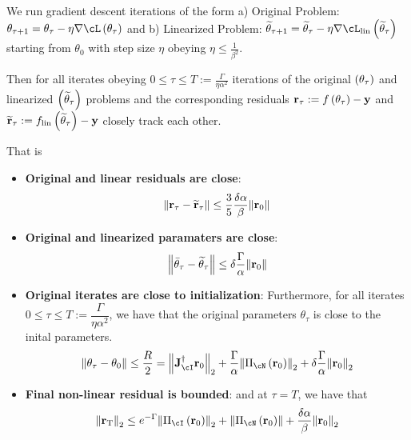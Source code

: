 \documentclass[a4paper]{article}
\begin{document}
\begin{thm}
  
  We run gradient descent iterations of the form a) Original Problem: $\theta_{\tau + 1} =
  \theta_\tau - \eta\nabla\cL\br{\theta_\tau}$ and
  b) Linearized Problem: $\widetilde{\theta}_{\tau+1} = \widetilde{\theta}_\tau -
  \eta\nabla\cL_{\mathrm{lin}}\br{\widetilde{\theta}_\tau}$ starting from $\theta_0$ with step
  size $\eta$ obeying $\eta\le \frac{1}{\beta^2}$. 

Then for all iterates obeying $0\le \tau\le T:= \frac{\Gamma}{\eta\alpha^2}$
  iterations of the original $\left({\theta_\tau}\right)$ and linearized
  $\left({\widetilde{\theta}_\tau}\right)$ problems and the corresponding
  residuals ${\mathbf{r}}_\tau:=f\left({\theta_\tau}\right) - {\mathbf{y}}$ and
  $\widetilde{{\mathbf{r}}}_\tau:=f_{\mathrm{lin}}\left({\widetilde{\theta}_\tau}\right)
  - {\mathbf{y}}$ closely track each other.

  That is
  \begin{itemize}
  \item \textbf{Original and linear residuals are close}: \begin{equation}
    \label{eq:residual_close}
    \mathrm{\left\lVert{\mathbf{r}}_\tau - \widetilde{{\mathbf{r}}}_\tau\right\rVert}\le \dfrac{3}{5}\dfrac{\delta\alpha}{\beta}\mathrm{\left\lVert{\mathbf{r}}_0\right\rVert}
  \end{equation}
\item \textbf{Original and linearized paramaters are close}:
  \begin{equation}
    \label{eq:param_close}
   \mathrm{\left\lVert\bar{\theta}_\tau - \widetilde{\theta}_\tau\right\rVert}\le \delta\dfrac{\Gamma}{\alpha}\mathrm{\left\lVert{\mathbf{r}}_0\right\rVert}
  \end{equation}
\item \textbf{Original iterates are close to initialization}: Furthermore, for all iterates $0\le \tau\le
T:=\dfrac{\Gamma}{\eta\alpha^2}$, we have that the original parameters
$\theta_\tau$ is close to the inital parameters.
\begin{equation}
  \label{eq:final_param_close}
  \norm{\theta_\tau - \theta_0}\le \dfrac{R}{2} =
  \norm{\vec{J}_{\cI}^\dagger\vec{r}_0}_2 +
  \dfrac{\Gamma}{\alpha}\norm{\Pi_\cN\br{\vec{r}_0}}_2 + \delta\dfrac{\Gamma}{\alpha}\norm{\vec{r}_0}_2
\end{equation}
\item \textbf{Final non-linear residual is bounded}: and at $\tau=T$, we have that
\begin{equation}
  \label{eq:final_residual}
  \norm{\vec{r}_T}_2\le e^{-\Gamma}\norm{\Pi_\cI\br{\vec{r}_0}}_2 +
  \norm{\Pi_\cN\br{\vec{r}_0}} + \dfrac{\delta\alpha}{\beta}\norm{\vec{r}_0}_2
\end{equation}
\end{itemize}
\end{thm}
\end{document}
